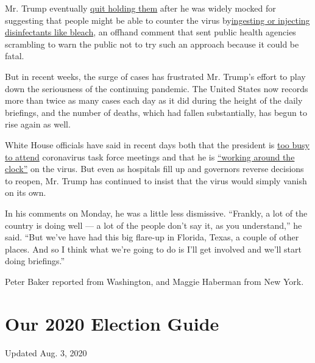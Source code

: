 Mr. Trump eventually
\href{https://www.nytimes3xbfgragh.onion/2020/04/27/us/politics/trump-coronavirus-briefings.html}{quit
holding them} after he was widely mocked for suggesting that people
might be able to counter the virus
by\href{https://www.nytimes3xbfgragh.onion/2020/04/24/us/politics/trump-inject-disinfectant-bleach-coronavirus.html}{ingesting
or injecting disinfectants like bleach}, an offhand comment that sent
public health agencies scrambling to warn the public not to try such an
approach because it could be fatal.

But in recent weeks, the surge of cases has frustrated Mr. Trump's
effort to play down the seriousness of the continuing pandemic. The
United States now records more than twice as many cases each day as it
did during the height of the daily briefings, and the number of deaths,
which had fallen substantially, has begun to rise again as well.

White House officials have said in recent days both that the president
is
\href{https://www.washingtonpost.com/politics/trump-defends-bungled-handling-of-coronavirus-with-falsehoods-and-dubious-claims/2020/07/19/1b57cb3e-c9e6-11ea-91f1-28aca4d833a0_story.html}{too
busy to attend} coronavirus task force meetings and that he is
\href{https://www.nytimes3xbfgragh.onion/2020/07/19/us/politics/republicans-contradict-trump-coronavirus.html}{``working
around the clock''} on the virus. But even as hospitals fill up and
governors reverse decisions to reopen, Mr. Trump has continued to insist
that the virus would simply vanish on its own.

In his comments on Monday, he was a little less dismissive. ``Frankly, a
lot of the country is doing well --- a lot of the people don't say it,
as you understand,'' he said. ``But we've have had this big flare-up in
Florida, Texas, a couple of other places. And so I think what we're
going to do is I'll get involved and we'll start doing briefings.''

Peter Baker reported from Washington, and Maggie Haberman from New York.

\hypertarget{our-2020-election-guide}{%
\section{Our 2020 Election Guide}\label{our-2020-election-guide}}

Updated Aug. 3, 2020

